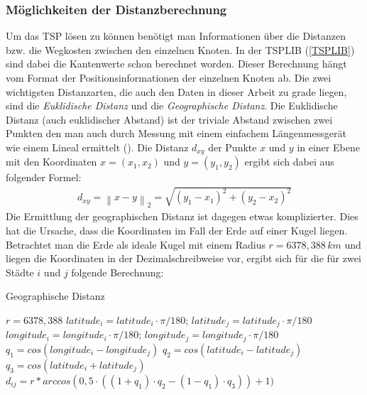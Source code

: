 \documentclass[doktyp=barbeit, sprache=german]{TUBAFarbeiten}
\begin{document}
\subsubsection{Möglichkeiten der Distanzberechnung}
Um das TSP lösen zu können benötigt man Informationen über die Distanzen bzw. die Wegkosten zwischen den einzelnen Knoten. In der TSPLIB (\ref{TSPLIB}) sind dabei die Kantenwerte schon berechnet worden. Dieser Berechnung hängt vom Format der Positionsinformationen der einzelnen Knoten ab. Die zwei wichtigsten Distanzarten, die auch den Daten in dieser Arbeit zu grade liegen, sind die \textit{Euklidische Distanz} und die \textit{Geographische Distanz}. Die Euklidische Distanz (auch euklidischer Abstand) ist der triviale Abstand zwischen zwei Punkten den man auch durch Messung mit einem einfachem Längenmessgerät wie einem Lineal ermittelt (\cite{Distanz}). Die Distanz $d_{xy}$ der Punkte $x$ und $y$ in einer Ebene mit den Koordinaten $x = (x_1, x_2)$ und $y = (y_1, y_2)$ ergibt sich dabei aus folgender Formel:
\begin{align}
\label{eq:Euclid}
d_{xy} = \left\| x - y \right\|_2 = \sqrt{{(y_1-x_1)}^2+{(y_2-x_2)}^2}
\end{align}
Die Ermittlung der geographischen Distanz ist dagegen etwas komplizierter. Dies hat die Ursache, dass die Koordinaten im Fall der Erde auf einer Kugel liegen. Betrachtet man die Erde als ideale Kugel mit einem Radius $r = 6378,388 \,km$ und liegen die Koordinaten in der Dezimalschreibweise vor, ergibt sich für die für zwei Städte $i$ und $j$ folgende Berechnung:
\begin{algorithm}
\caption{Geographische Distanz}
\label{geodistance}
\begin{algorithmic}[1]
\State $r = 6378,388$
\State $latitude_i = latitude_i \cdot \pi / 180; \,latitude_j = latitude_j \cdot \pi / 180$
\State $longitude_i = longitude_i \cdot \pi / 180;\, longitude_j =longitude_j \cdot \pi / 180$
\State $q_1 = cos(longitude_i - longitude_j)$
\State $q_2 = cos(latitude_i - latitude_j)$
\State $q_3 = cos(latitude_i + latitude_j)$
\State \textbf{$d_{ij} = r * arccos(0,5 \cdot ((1 + q_1) \cdot q_2 - (1 - q_1) \cdot q_3)) + 1)$}
\end{algorithmic}
\end{algorithm}
\end{document}
